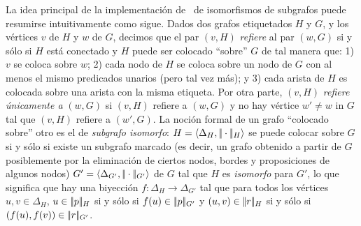 La idea principal de la implementaci\'on de~\cite{Krahmer2003} de isomorfismos de subgrafos puede resumirse intuitivamente como sigue.
Dados dos grafos etiquetados $H$ y $G$, y los v\'ertices  $v$ de $H$
y $w$ de $G$, decimos que el par $(v, H)$ {\em refiere}
al par $(w, G)$ si y s\'olo si $H$ est\'a conectado y $H$ puede ser colocado ``sobre'' $G$ de tal manera que: 1) $v$ se coloca sobre $w$; 2) cada
nodo de $H$ se coloca sobre un nodo de $G$ con al menos el mismo
predicados unarios (pero tal vez m\'as); y 3) cada arista de $H$ es
colocada sobre una arista con la misma etiqueta. Por otra parte, $(v, H)$ {\em
refiere \'unicamente a} $(w, G)$ si $(v, H)$ refiere a $(w, G)$ y no hay
v\'ertice $w'\not=w$ in $G$ tal que $(v, H)$ refiere a $(w', G)$.
La noci\'on formal de un grafo ``colocado sobre'' otro es el de 
{\em subgrafo isomorfo}:
$H=\langle \Delta_H,|\!|\cdot|\!|_H \rangle$ se puede colocar sobre
$G$ si y s\'olo si existe un subgrafo marcado (es decir, un grafo obtenido a partir de
$G$ posiblemente por la eliminaci\'on de ciertos nodos, bordes y proposiciones de algunos nodos)
$G'=\langle \Delta_{G'},|\!|\cdot|\!|_{G'} \rangle$ de $G$ tal que $H$ es {\em
isomorfo} para ${G'}$, lo que significa que hay una biyecci\'on
$f:\Delta_{H}\to\Delta_{G'}$ tal que para todos los v\'ertices
$u,v\in \Delta_H$, $u\in|\!|p|\!|_{H}$ si y s\'olo si $f(u)\in|\!|p|\!|_{G'}$
y $(u,v)\in|\!|r|\!|_{H}$ si y s\'olo si $(f(u),f(v))\in|\!|r|\!|_{G'}$.
%

